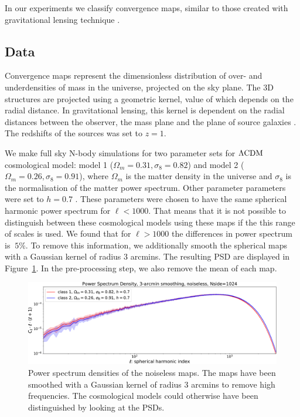 \documentclass[final,twocolumn,3p,times,authoryear]{elsarticle}
\newcommand{\todo}[1]{{\color[rgb]{.6,.1,.6}{#1}}}
\newcommand{\figref}[1]{Figure~\ref{fig:#1}}
\newcommand{\1}{\b{1}}              %
\newcommand{\0}{\b{0}}              %
\begin{document}
In our experiments we classify convergence maps, similar to those created with gravitational lensing technique \citep{chang2017curvedsky}.

\subsection{Data}
\label{sec:data}

Convergence maps represent the dimensionless distribution of over- and underdensities of mass in the universe, projected on the sky plane.
The 3D structures are projected using a geometric kernel, value of which depends on the radial distance.
In gravitational lensing, this kernel is dependent on the radial distances between the observer, the mass plane and the plane of source galaxies \citep[see][for review of gravitational lensing]{bartelman2010gravitationallensing}.
The redshifts of the sources was set to $z=1$.

We make full sky N-body simulations for two parameter sets for $\Lambda \rm{CDM} $ cosmological model: model 1 ($\Omega_m=0.31, \sigma_8=0.82$) and model 2 ($\Omega_m=0.26, \sigma_8=0.91$), where $\Omega_m$ is the matter density in the universe and $\sigma_8$ is the normalisation of the matter power spectrum.
Other parameter parameters were set to $h=0.7$ \todo{(MORE PARAMS HERE - CHECK WITH RAPHAEL)}.
These parameters were chosen to have the same spherical harmonic power spectrum for $\ell<1000$.
That means that it is not possible to distinguish between these cosmological models using these maps if the this range of scales is used.
We found that for $\ell>1000$ the differences in power spectrum is $~5\%$.
To remove this information, we additionally smooth the spherical maps with a Gaussian kernel of radius $3$ arcmins. The resulting PSD are displayed in \figref{psd_sigma3}. In the pre-processing step, we also remove the mean of each map.

\begin{figure}[!ht]
\centering
\includegraphics[width=\linewidth]{figures/psd_sigma3.pdf}
\caption{Power spectrum densities of the noiseless maps. The maps have been smoothed with a Gaussian kernel of radius $3$ arcmins to remove high frequencies. The cosmological models could otherwise have been distinguished by looking at the PSDs.}
\label{fig:psd_sigma3}
\end{figure}
\end{document}
